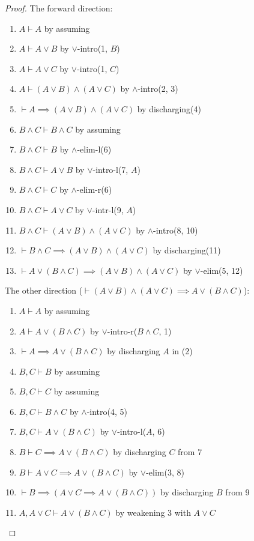 \begin{proof}
The forward direction:
\begin{enumerate}
\item $A\vdash A$ by assuming%
\item $A\vdash A\lor B$ by $\lor$-intro(1, $B$)%
\item $A\vdash A\lor C$ by $\lor$-intro(1, $C$)%
\item $A\vdash(A\lor B)\land(A\lor C)$ by $\land$-intro(2, 3)%
\item $\vdash A\implies(A\lor B)\land(A\lor C)$ by discharging(4)%
\item $B\land C\vdash B\land C$ by assuming%
\item $B\land C\vdash B$ by $\land$-elim-l(6)%
\item $B\land C\vdash A\lor B$ by $\lor$-intro-l(7, $A$)%
\item $B\land C\vdash C$ by $\land$-elim-r(6)%
\item $B\land C\vdash A\lor C$ by $\lor$-intr-l(9, $A$)%
\item $B\land C\vdash (A\lor B)\land(A\lor C)$ by $\land$-intro(8, 10)%
\item $\vdash B\land C\implies(A\lor B)\land(A\lor C)$ by discharging(11)%
\item $\vdash A\lor(B\land C)\implies(A\lor B)\land(A\lor C)$ by $\lor$-elim(5, 12)%
\end{enumerate}
The other direction ($\vdash(A\lor B)\land(A\lor C)\implies A\lor(B\land C)$):
\begin{enumerate}
\item $A\vdash A$ by assuming%
\item $A\vdash A\lor(B\land C)$ by $\lor$-intro-r($B\land C$, 1)%
\item $\vdash A\implies A\lor(B\land C)$ by discharging $A$ in (2)%
\item $B,C\vdash B$ by assuming%
\item $B,C\vdash C$ by assuming%
\item $B,C\vdash B\land C$ by $\land$-intro(4, 5)%
\item $B,C\vdash A\lor(B\land C)$ by $\lor$-intro-l($A$, 6)%
\item $B\vdash C\implies A\lor(B\land C)$ by discharging $C$ from 7%
\item $B\vdash A\lor C\implies A\lor(B\land C)$ by $\lor$-elim(3, 8)%
\item $\vdash B\implies(A\lor C\implies A\lor(B\land C))$ by
  discharging $B$ from 9%
\item $A,A\lor C\vdash A\lor(B\land C)$ by weakening 3 with $A\lor C$%

\end{enumerate}
\end{proof}

